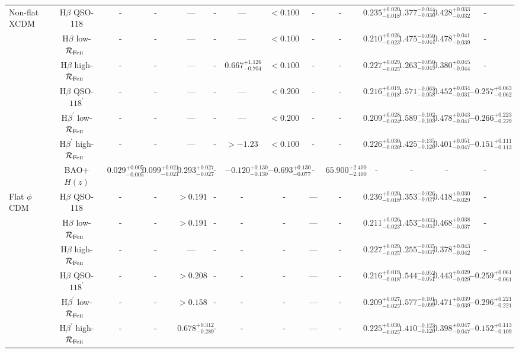 \documentclass[a4paper,fleqn,usenatbib]{mnras}
\newcommand{\rfe}{${\cal R}_{\rm{Fe\textsc{ii}}}$}
\begin{document}
\begin{sidewaystable*}
\begin{adjustbox}{angle=0}
\begin{threeparttable}
{\begin{tabular}{lcccccccccccccc}
\hline
Non-flat XCDM & H$\beta$ QSO-118 &-&-& --- & - & --- & $< 0.100$ & - & - & $0.235^{+0.020}_{-0.018}$ & $1.377^{-0.044}_{-0.036}$ & $0.428^{+0.033}_{-0.032}$ & -\\
& H$\beta$ low-\rfe\ &-&-& --- & - & --- & $< 0.100$ & - & - & $0.210^{+0.026}_{-0.023}$ & $1.475^{-0.050}_{-0.044}$ & $0.478^{+0.041}_{-0.039}$ & -\\
& H$\beta$ high-\rfe\ &-&-& --- & - & $0.667^{+1.126}_{-0.704}$ & $< 0.100$ & - & - & $0.227^{+0.029}_{-0.025}$ & $1.263^{-0.050}_{-0.045}$ & $0.380^{+0.045}_{-0.044}$ & -\\
& H$\beta$ QSO-$118^{\prime}$ &-&-& --- & - & --- & $< 0.200$ & - & -  & $0.216^{+0.019}_{-0.018}$ & $1.571^{-0.063}_{-0.058}$ & $0.452^{+0.034}_{-0.031}$ & $-0.257^{+0.063}_{-0.062}$\\
& H$\beta^{\prime}$ low-\rfe\ &-&-& --- & - & --- & $< 0.200$ & - & - & $0.209^{+0.028}_{-0.024}$ & $1.589^{-0.102}_{-0.103}$ & $0.478^{+0.043}_{-0.041}$ & $-0.266^{+0.223}_{-0.229}$\\
& H$\beta^{\prime}$ high-\rfe\ &-&-& --- & - & $> -1.23$ & $< 0.100$ & - & - & $0.226^{+0.030}_{-0.026}$ & $1.425^{-0.135}_{-0.126}$ & $0.401^{+0.051}_{-0.047}$ & $-0.151^{+0.111}_{-0.113}$\\
& BAO+$H(z)$ & $0.029^{+0.005}_{-0.005}$ & $0.099^{+0.021}_{-0.021}$ & $0.293^{+0.027}_{-0.027}$ & - & $-0.120^{+0.130}_{-0.130}$ & $-0.693^{+0.130}_{-0.077}$ & - &$65.900^{+2.400}_{-2.400}$& - & - & - & -\\
\hline
Flat $\phi$CDM & H$\beta$ QSO-118 &-&-& $> 0.191$ & - & - & - & --- & -  & $0.236^{+0.020}_{-0.018}$ & $1.353^{-0.026}_{-0.027}$ & $0.418^{+0.030}_{-0.029}$ & -\\
& H$\beta$ low-\rfe\ &-&-& $> 0.191$ & - & - & - & --- & - & $0.211^{+0.026}_{-0.023}$ & $1.453^{-0.033}_{-0.034}$ & $0.468^{+0.038}_{-0.037}$ & -\\
& H$\beta$ high-\rfe\ &-&-& --- & - & - & - & --- & - & $0.227^{+0.029}_{-0.025}$ & $1.255^{-0.035}_{-0.037}$ & $0.378^{+0.043}_{-0.042}$ & -\\
& H$\beta$ QSO-$118^{\prime}$ &-&-& $> 0.208$ & - & - & - & --- & - & $0.216^{+0.019}_{-0.018}$ & $1.544^{-0.052}_{-0.051}$ & $0.443^{+0.029}_{-0.029}$ & $-0.259^{+0.061}_{-0.061}$\\
& H$\beta^{\prime}$ low-\rfe\ &-&-& $> 0.158$ & - & - & - & --- & - & $0.209^{+0.027}_{-0.025}$ & $1.577^{-0.101}_{-0.099}$ & $0.471^{+0.039}_{-0.039}$ & $-0.296^{+0.221}_{-0.221}$\\
& H$\beta^{\prime}$ high-\rfe\ &-&-& $0.678^{+0.312}_{-0.289}$ & - & - & - & --- & - & $0.225^{+0.030}_{-0.025}$ & $1.410^{-0.123}_{-0.120}$ & $0.398^{+0.047}_{-0.047}$ & $-0.152^{+0.113}_{-0.109}$\\

\end{tabular}}
\end{threeparttable}
\end{adjustbox}
\end{sidewaystable*}
\end{document}
